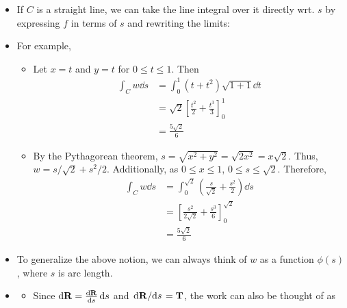 \documentclass[../main.tex]{subfiles}
\begin{document}
\begin{itemize}
    \item If $C$ is a straight line, we can take the line integral over it directly wrt. $s$ by expressing $f$ in terms of $s$ and rewriting the limits:
    \item For example, 
    \begin{itemize}
        \item Let $x=t$ and $y=t$ for $0\leq t\leq 1$. Then
        \begin{align*}
            \int_Cw\dd{s} &= \int_0^1(t+t^2)\sqrt{1+1}\dd{t}\\
            &= \sqrt{2}\left[ \frac{t^2}{2}+\frac{t^3}{3} \right]_0^1\\
            &= \frac{5\sqrt{2}}{6}
        \end{align*}
        \item By the Pythagorean theorem, $s=\sqrt{x^2+y^2}=\sqrt{2x^2}=x\sqrt{2}$. Thus, $w=s/\sqrt{2}+s^2/2$. Additionally, as $0\leq x\leq 1$, $0\leq s\leq\sqrt{2}$. Therefore,
        \begin{align*}
            \int_Cw\dd{s} &= \int_0^{\sqrt{2}}\left( \frac{s}{\sqrt{2}}+\frac{s^2}{2} \right)\dd{s}\\
            &= \left[ \frac{s^2}{2\sqrt{2}}+\frac{s^3}{6} \right]_0^{\sqrt{2}}\\
            &= \frac{5\sqrt{2}}{6}
        \end{align*}
    \end{itemize}
    \item To generalize the above notion, we can always think of $w$ as a function $\phi(s)$, where $s$ is arc length.
    \item {}
    \begin{itemize}
        \item Since $\dd{\mathbf{R}}=\dv{\mathbf{R}}{s}\dd{s}$ and $\dv*{\mathbf{R}}{s}=\mathbf{T}$, the work can also be thought of as 

\end{itemize}
\end{itemize}
\end{document}
